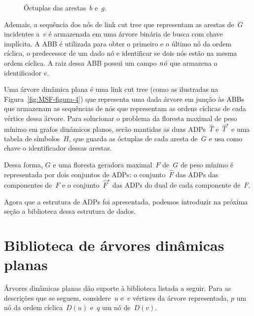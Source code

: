 \begin{figure}[htb]
\centering

\caption{Óctuplas das arestas~$b$ e~$g$.}
\label{fig:MSF-octo}
\end{figure}


Ademais, a sequência dos nós de link cut tree que representam as arestas de~$G$ incidentes a~$v$ é armazenada em uma árvore binária de busca com chave implícita.
A ABB é utilizada para obter o primeiro e o último nó da ordem cíclica, o predecessor de um dado nó e identificar se dois nós estão na mesma ordem cíclica.
A raiz dessa ABB possui um campo $\mathit{n\acute{o}}$ que armazena o identificador $v$.

Uma árvore dinâmica plana é uma link cut tree (como as ilustradas na Figura~\ref{fig:MSF-figura-4}) que representa uma dada árvore em junção às ABBs que armazenam as sequências de nós que representam as ordens cíclicas de cada vértice dessa árvore.
Para solucionar o problema da floresta maximal de peso mínimo em grafos dinâmicos planos, serão mantidas as duas ADPs~$\hat T$ e~$\hat T^\star$ e uma tabela de símbolos~$H$, que guarda as óctuplas de cada aresta de~$G$ e usa como chave o identificador dessas arestas.


Dessa forma, $G$ e uma floresta geradora maximal~$F$ de~$G$ de peso mínimo é representada por dois conjuntos de ADPs: o conjunto~$\hat F$ das ADPs das componentes de~$F$ e o conjunto~$\hat F^\star$ das ADPs do dual de cada componente de~$F$.

Agora que a estrutura de ADPs foi apresentada, podemos introduzir na próxima seção a biblioteca dessa estrutura de dados.

\section{Biblioteca de árvores dinâmicas planas}
\label{sec:EODT}

Árvores dinâmicas planas dão suporte à biblioteca listada a seguir.
Para as descrições que se seguem, considere~$u$ e~$v$ vértices da árvore representada,
$p$ um nó da ordem cíclica~$D(u)$ e~$q$ um nó de~$D(v)$.

